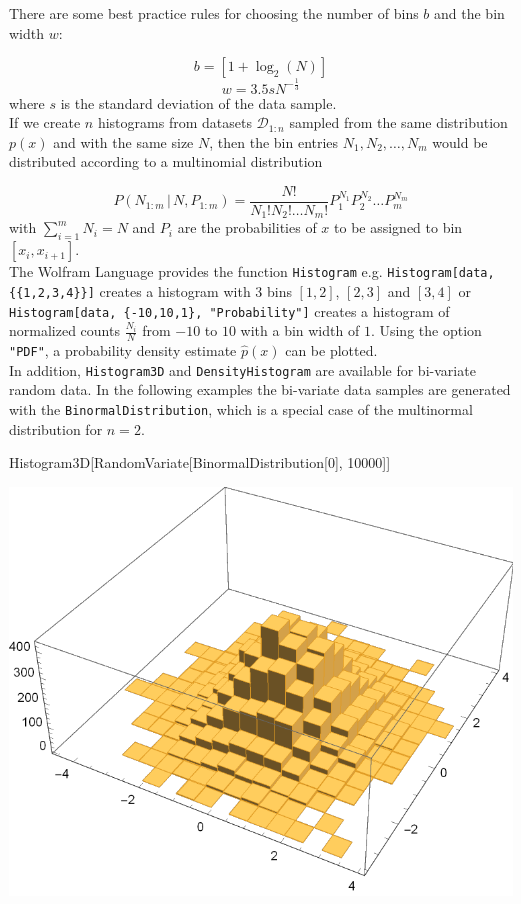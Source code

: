 \documentclass{tstextbook}
\begin{document}
There are some best practice rules for choosing the number of bins $b$ and the bin width $w$:

  \begin{equation}
        b = [1 + \log_{2}(N)]
  \end{equation}
  \begin{equation}
        w = 3.5 s N^{-\frac{1}{3}}
  \end{equation}
where $s$ is the standard deviation of the data sample.\\

If we create $n$ histograms from datasets $\mathcal{D}_{1:n}$ sampled from the same distribution $p(x)$ and with the same size $N$, then the bin entries $N_1,N_2,\ldots,N_m$ would be distributed according to a multinomial distribution

  \begin{equation}
    P(N_{1:m}\,\vert\, N,P_{1:m})=\frac{N!}{N_1!N_2!\ldots N_m!}P_1^{N_1}P_2^{N_2}\ldots P_m^{N_m}
  \end{equation}
with $\sum_{i=1}^m N_i=N$ and $P_i$ are the probabilities of $x$ to be assigned to bin $[x_i,x_{i+1}]$.\\

The Wolfram Language provides the function \texttt{Histogram} e.g. \texttt{Histogram[data, \{\{1,2,3,4\}\}]} creates a histogram with 3 bins $[1,2]$, $[2,3]$ and $[3,4]$ or \texttt{Histogram[data, \{-10,10,1\}, "Probability"]} creates a histogram of normalized counts $\frac{N_i}{N}$ from $-10$ to $10$ with a bin width of $1$. Using the option \texttt{"PDF"}, a probability density estimate $\hat{p}(x)$ can be plotted.\\

In addition, \texttt{Histogram3D} and \texttt{DensityHistogram} are available for bi-variate random data. In the following examples the bi-variate data samples are generated with the \texttt{BinormalDistribution}, which is a special case of the multinormal distribution for $n=2$.

\begin{mathematica}
Histogram3D[RandomVariate[BinormalDistribution[0], 10000]]
\end{mathematica}

 \includegraphics{images/histogram_3d.pdf}
 
\end{document}
